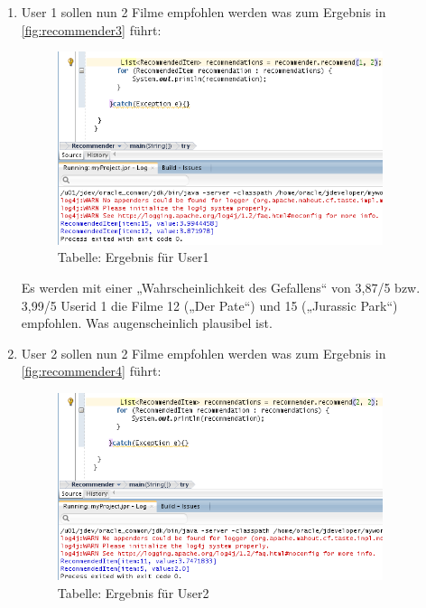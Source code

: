 \begin{enumerate}
\item User 1 sollen nun 2 Filme empfohlen werden was zum Ergebnis in \autoref{fig:recommender3} führt:
\begin{figure}[!htb]
        \begin{minipage}{1\textwidth}
                \centering
                \includegraphics[width=0.90\textwidth]{pics/recommender3.png}\par\vspace{0cm}
                \caption{Tabelle: Ergebnis für User1}
                \label{fig:recommender3}
        \end{minipage}
\end{figure}

Es werden mit einer „Wahrscheinlichkeit des Gefallens“ von 3,87/5 bzw. 3,99/5   Userid 1 die Filme 12 („Der Pate“) und 15 („Jurassic Park“) empfohlen. Was augenscheinlich plausibel ist.

\item User 2 sollen nun 2 Filme empfohlen werden was zum Ergebnis in \autoref{fig:recommender4} führt:
\begin{figure}[!htb]
        \begin{minipage}{1\textwidth}
                \centering
                \includegraphics[width=0.90\textwidth]{pics/recommender4.png}\par\vspace{0cm}
                \caption{Tabelle: Ergebnis für User2}
                \label{fig:recommender4}
        \end{minipage}
\end{figure}


\end{enumerate}
